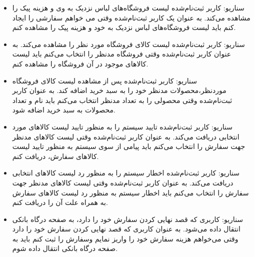 \documentclass[14pt]{article}
\begin{document}
\begin{flushright}
\begin{itemize}
\item سناریو: کاربر ثبت‌نام‌شده لیست فروشگاه‌های لباس نزدیک به وی و هزینه پیک را مشاهده می‌کند.
\newline
به عنوان یک کاربر ثبت‌نام‌شده
\newline
وقتی می خواهم سفارشی را ایجاد کنم
\newline
باید لیست فروشگاه‌های لباس نزدیک به خود و هزینه پیک را مشاهده کنم.

\item سناریو: کاربر ثبت‌نام‌شده لیست کالای فروشگاه مورد نظر را مشاهده می‌کند.
\newline
به عنوان کاربر ثبت‌نام‌شده
\newline
وقتی فروشگاه مدنظر را انتخاب می‌کنم
\newline
باید لیست کالاهای موجود در آن فروشگاه را مشاهده کنم.

\item سناریو: کاربر ثبت‌نام‌شده پس از مشاهده لیست کالای فروشگاه موردنظر،محصولات مدنظر خود را به سبد خرید اضافه کند.
\newline
به عنوان کاربر ثبت‌نام‌شده
\newline
وقتی محصولی را به تعداد مدنظر انتخاب می‌کنم
\newline
باید نام و تعداد محصولات به سبد خرید اضافه شود.


\item سناریو: کاربر ثبت‌نام‌شده تایید سیستم را به منظور تایید لیست کالاهای مورد انتخابی دریافت می‌کند.
\newline
به عنوان کاربر ثبت‌نام‌شده
\newline
وقتی لیست کالاهای مدنظر جهت سفارش را انتخاب می‌کنم
\newline
باید پیامی از سوی سیستم به منظور تایید لیست کالاهای سفارش، دریافت کنم. 


\item سناریو: کاربر ثبت‌نام‌‌شده اخطار سیستم را به منظور رد لیست کالاهای انتخابی دریافت می‌کند.
\newline
به عنوان کاربر ثبت‌نام‌شده
\newline
وقتی لیست کالاهای  مدنظر جهت سفارش را انتخاب می‌کنم
\newline
باید اخطار سیستم به منظور رد لیست کالاهای سفارش به همراه علت آن را دریافت کنم. 


\item سناریو: کاربری که قصد نهایی کردن سفارش خود را دارد، به صفحه درگاه بانکی انتقال داده می‌شود.
\newline
به عنوان کاربری که قصد نهایی کردن سفارش خود را دارد
\newline
وقتی می‌خواهم هزینه سفارش خود را واریز نمایم وسفارش را ثبت کنم
\newline
باید به صفحه درگاه بانکی انتقال داده شوم.


\end{itemize}
\end{flushright}
\end{document}
